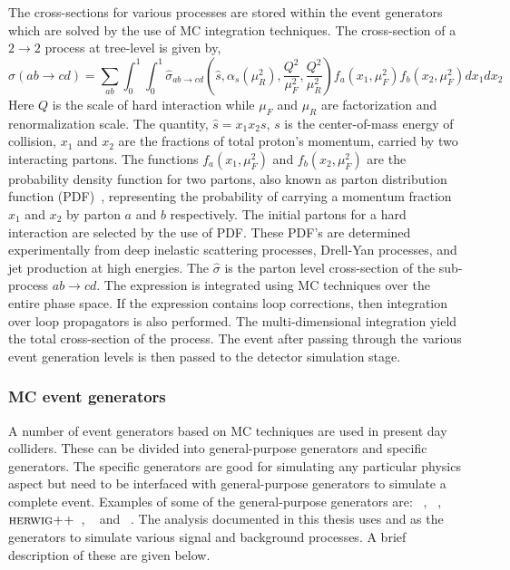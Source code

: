The cross-sections for various processes are stored within the event generators which are solved by the use of MC integration techniques.
The cross-section of a $2\rightarrow2$ process at tree-level is given by,
\begin{equation}
\sigma(ab\rightarrow{cd})=\sum_{ab}\int_{0}^{1}\int_{0}^{1} \hat{\sigma}_{ab\rightarrow{cd}}
            \left(\hat{s},\alpha_{s}(\mu_{R}^{2}),\frac{Q^{2}}{\mu_{F}^{2}},\frac{Q^{2}}{\mu_{R}^{2}}\right)f_{a}(x_{1},\mu_{F}^{2})f_{b}(x_{2},\mu_{F}^{2})dx_{1}dx_{2} 
\label{eq:gamJetXS}
\end{equation}
Here $Q$ is the scale of hard interaction while $\mu_{F}$ and $\mu_{R}$ are factorization and renormalization scale. 
The quantity, $\hat{s}=x_{1}x_{2}s$, $s$ is the center-of-mass energy of collision, $x_{1}$ and $x_{2}$ are the fractions of total proton's momentum, carried by two
interacting partons. The functions $f_{a}(x_{1},\mu^{2}_{F})$ and $f_{b}(x_{2},\mu_{F}^{2})$ are the probability density function for two partons,
also known as parton distribution function (PDF)~\cite{Martin:2009iq},
representing the probability of carrying a momentum fraction $x_{1}$ and $x_{2}$ by parton $a$ and $b$ respectively.
The initial partons for a hard interaction are selected by the use of PDF.
These PDF's are determined experimentally from deep inelastic scattering processes, Drell-Yan processes, and jet production at high energies.
The $\hat{\sigma}$ is the parton level cross-section of the sub-process $ab\rightarrow{cd}$.
The expression is integrated using MC techniques over the entire phase space.
If the expression contains loop corrections, then integration over loop propagators is also performed. The multi-dimensional integration
yield the total cross-section of the process. The event after passing through the various event generation levels is then
passed to the detector simulation stage.
\subsubsection{MC event generators}
A number of event generators based on MC techniques are used in present day colliders. These can be divided into general-purpose generators and specific generators.
The specific generators are good for simulating any particular physics aspect but need to be interfaced with general-purpose generators to simulate a complete
event. Examples of some of the general-purpose generators are: \pythia~\cite{Sjostrand:2014zea}, \madgraph~\cite{Alwall:2014hca},
${\textsc{herwig++}}$~\cite{Bahr:2008pv}, \alpgen~\cite{Mangano:2002ea} and \sherpa~\cite{Gleisberg:2008ta}. The analysis
documented in this thesis uses \pythia and \madgraph as the generators to simulate various signal and background processes. A brief description of these
are given below.
